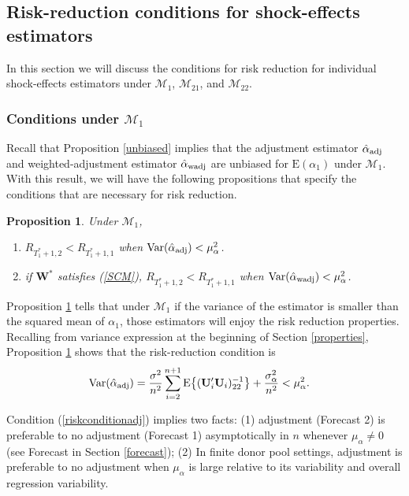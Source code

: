 \documentclass[11pt]{article}
\def\mbf#1{\mathbf{#1}} %
\def\mrm#1{\mathrm{#1}} %
\def\mc#1{\mathcal{#1}} %
\def\E#1{\mathrm{E}(#1)} %
\def\var#1{\mathrm{Var}(#1)} %
\DeclareMathOperator{\Var}{Var} %
\newtheorem{prop}{Proposition}
\theoremstyle{definition}
\begin{document}
\subsection{Risk-reduction conditions for shock-effects estimators}
\label{conditions}

In this section we will discuss the conditions for risk reduction for individual shock-effects estimators under $\mc{M}_1$, $\mc{M}_{21}$, and $\mc{M}_{22}$. %

\subsubsection{Conditions under $\mc{M}_1$}
 \label{conditionsmodel1}
 
Recall that Proposition \ref{unbiased} implies that the adjustment estimator $\hat{\alpha}_{\rm adj}$ and weighted-adjustment estimator $\hat{\alpha}_{\rm wadj}$ are unbiased for $\E{\alpha_1}$ under $\mc{M}_1$. With this result, we will have  the following propositions that specify the conditions that are necessary for risk reduction. 

\begin{prop}
\label{proprisk}Under $\mc{M}_1$,
\begin{enumerate}[label = (\roman*)]
  \item  $R_{T_1^*+1, 2} < R_{T_1^*+1, 1}$ when 
$\Var(\hat{\alpha}_{\rm adj}) < \mu_{\alpha}^2$.
  \item if $\mbf{W}^*$ satisfies (\ref{SCM}), $R_{T_1^*+1,2}<R_{T_1^*+1,1}$ when $\var{\hat{\alpha}_{\rm wadj}}<\mu_{\alpha}^2$. 
\end{enumerate}
\end{prop}

Proposition \ref{proprisk} tells that under $\mc{M}_1$ if the variance of the estimator is smaller than the squared mean of $\alpha_1$, those estimators will enjoy the risk reduction properties. Recalling from variance expression at the beginning of Section \ref{properties}, Proposition \ref{proprisk} shows that the risk-reduction condition is
\begin{align}
  \var{\hat{\alpha}_{\rm adj}} 
  &=\frac{\sigma^2}{n^2}\sum_{i=2}^{n+1}\mrm{E}\big\{(\mbf{U}'_i\mbf{U}_i)^{-1}_{22}\big\}+\frac{\sigma^2_{\alpha}}{n^2} < \mu_{\alpha}^2. \label{riskconditionadj}
\end{align}

Condition (\ref{riskconditionadj}) implies two facts: (1) adjustment (Forecast 2) is preferable to no adjustment (Forecast 1) asymptotically in $n$ whenever $\mu_{\alpha} \neq 0$ (see Forecast in Section \ref{forecast}); (2) In finite donor pool settings, adjustment is preferable to no adjustment when $\mu_{\alpha}$ is large relative to its variability and overall regression variability.   %
\end{document}
